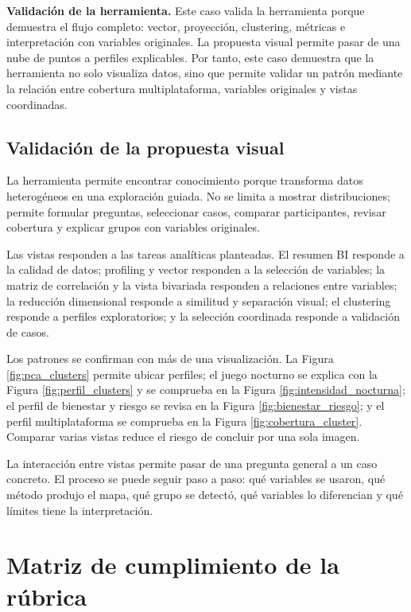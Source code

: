 \documentclass[12pt,a4paper]{article}
\begin{document}
\textbf{Validaci\'on de la herramienta.} Este caso valida la herramienta porque demuestra el flujo completo: vector, proyecci\'on, clustering, m\'etricas e interpretaci\'on con variables originales. La propuesta visual permite pasar de una nube de puntos a perfiles explicables. Por tanto, este caso demuestra que la herramienta no solo visualiza datos, sino que permite validar un patr\'on mediante la relaci\'on entre cobertura multiplataforma, variables originales y vistas coordinadas.

\subsection{Validaci\'on de la propuesta visual}

La herramienta permite encontrar conocimiento porque transforma datos heterog\'eneos en una exploraci\'on guiada. No se limita a mostrar distribuciones; permite formular preguntas, seleccionar casos, comparar participantes, revisar cobertura y explicar grupos con variables originales.

Las vistas responden a las tareas anal\'iticas planteadas. El resumen BI responde a la calidad de datos; profiling y vector responden a la selecci\'on de variables; la matriz de correlaci\'on y la vista bivariada responden a relaciones entre variables; la reducci\'on dimensional responde a similitud y separaci\'on visual; el clustering responde a perfiles exploratorios; y la selecci\'on coordinada responde a validaci\'on de casos.

Los patrones se confirman con m\'as de una visualizaci\'on. La Figura \ref{fig:pca_clusters} permite ubicar perfiles; el juego nocturno se explica con la Figura \ref{fig:perfil_clusters} y se comprueba en la Figura \ref{fig:intensidad_nocturna}; el perfil de bienestar y riesgo se revisa en la Figura \ref{fig:bienestar_riesgo}; y el perfil multiplataforma se comprueba en la Figura \ref{fig:cobertura_cluster}. Comparar varias vistas reduce el riesgo de concluir por una sola imagen.

La interacci\'on entre vistas permite pasar de una pregunta general a un caso concreto. El proceso se puede seguir paso a paso: qu\'e variables se usaron, qu\'e m\'etodo produjo el mapa, qu\'e grupo se detect\'o, qu\'e variables lo diferencian y qu\'e l\'imites tiene la interpretaci\'on.

\section{Matriz de cumplimiento de la r\'ubrica}
\end{document}
